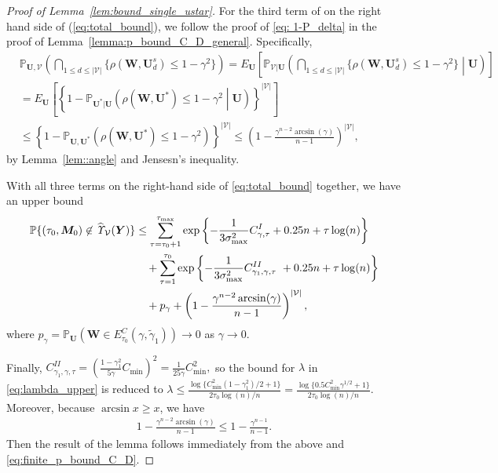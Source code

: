\documentclass[12pt]{article}
\theoremstyle{shortspace}
\def\*#1{\bm{#1}}
\def\P{\mathbb P}
\begin{document}
\begin{proof}[Proof of Lemma~\ref{lem:bound_single_ustar}]
For the third term of on the right hand side of (\ref{eq:total_bound}), we follow the proof of \eqref{eq: 1-P_delta} in the proof of  Lemma~\ref{lemma:p_bound_C_D_general}. Specifically, 
\begin{align*}
   & \P_{\*U,\mathcal V} \left(\bigcap_{1 \leq d \leq |\mathcal V|}\{\rho(\*W,\*U^s_d) \leq 1 - \gamma^2 \}\right) = E_{\*U}\left[ \P_{\mathcal V|\*U} \left(\bigcap_{1 \leq d \leq |\mathcal V|}\{\rho(\*W,\*U^s_d) \leq 1 - \gamma^2 \} \middle | \*U\right)\right] \\
  &  =  E_{\*U}\left[ \left\{1 - \P_{\*U^*|\*U} \left(\rho(\*W,\*U^*) \leq 1 - \gamma^2  \middle | \*U\right)\right\}^{|\mathcal V|}\right] \\
  & \leq \left\{1 - \P_{\*U,\*U^*} \left(\rho(\*W,\*U^*) \leq 1 - \gamma^2  \right)\right\}^{|\mathcal V|} \leq \left(1-\frac{\gamma^{n-2}\arcsin (\gamma)}{n-1}\right)^{|{\mathcal V}|},
\end{align*}
by Lemma~\ref{lem::angle} and Jensesn's inequality. 



With all three terms on the right-hand side of \eqref{eq:total_bound} together, we have an upper bound
\begin{align}
\label{eq:finite_p_bound_C_D}
     \P\{(\tau_0, \*M_0) \not\in \widehat{\it \Upsilon}_{{\mathcal V}}(\*Y)\} & \leq 
     \sum^{\tau_{\max}}_{\tau=\tau_0+1}
    \exp\left\{-\frac{1}{3\sigma^2_{\max}} C^I_{\gamma, \tau} + 0.25n +  \tau\log(n) \right\} \nonumber \\
    & \quad  +  \sum_{\tau=1}^{\tau_0} \exp\left\{-\frac{1}{3\sigma^2_{\max}} C^{II}_{\gamma_1,\gamma, \tau}\ + 0.25n + \tau\log(n)\right\}\nonumber\\
     & \quad 
     + p_\gamma  +  \left(1-\frac{\gamma^{n-2}\arcsin (\gamma)}{n-1}\right)^{|{\mathcal V}|},
\end{align}
where $p_\gamma = \P_{\*U}\left(\*W \in E^C_{\tau_0}( \gamma, \widetilde \gamma_1)\right) \rightarrow 0$ as $\gamma \rightarrow 0.$

 Finally, 
 $C^{II}_{\gamma_1,\gamma, \tau} = \left(\frac{1-\gamma_1^2}{5\gamma}C_{\min}\right)^2 = \frac{1}{25\gamma} C^2_{\min},$  so the bound for $\lambda$ in \eqref{eq:lambda_upper} is reduced to   $\lambda \leq \frac{\log\{C^2_{\min}(1- \gamma^2_1)/2 + 1\}}{2 \tau_0 \log(n)/n} = \frac{\log\{0.5C^2_{\min}\gamma^{1/2} + 1\}}{2 \tau_0 \log(n)/n} .$
Moreover, because $\arcsin x \geq x$, we have
\begin{align*}
    1-\frac{\gamma^{n-2}\arcsin (\gamma)}{n-1} \leq 1-\frac{\gamma^{n-1}}{n-1}.
\end{align*}
Then the result of the lemma  
follows immediately from the above and \eqref{eq:finite_p_bound_C_D}.

\end{proof}
\end{document}
